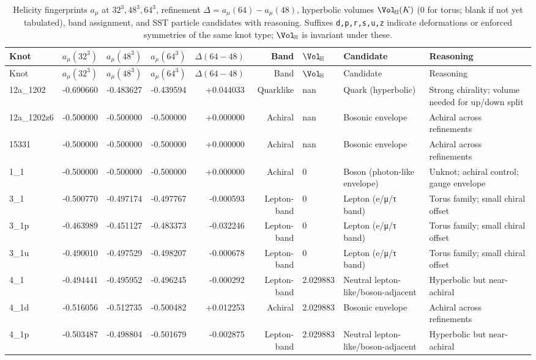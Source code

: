 \begin{longtable}{lrrrrrllp{6.8cm}}
\caption{Helicity fingerprints $a_\mu$ at $32^3,48^3,64^3$, refinement $\Delta=a_\mu(64)-a_\mu(48)$, hyperbolic volumes $\Vol_{\!\mathbb{H}}(K)$ (0 for torus; blank if not yet tabulated), band assignment, and SST particle candidates with reasoning. Suffixes \texttt{d,p,r,s,u,z} indicate deformations or enforced symmetries of the same knot type; $\Vol_{\!\mathbb{H}}$ is invariant under these.}\\
\toprule
Knot & $a_\mu(32^3)$ & $a_\mu(48^3)$ & $a_\mu(64^3)$ & $\Delta(64{-}48)$ & Band & $\Vol_{\!\mathbb{H}}$ & Candidate & Reasoning \\
\midrule
\endfirsthead
\toprule
Knot & $a_\mu(32^3)$ & $a_\mu(48^3)$ & $a_\mu(64^3)$ & $\Delta(64{-}48)$ & Band & $\Vol_{\!\mathbb{H}}$ & Candidate & Reasoning \\
\midrule
\endhead
\bottomrule
\endlastfoot
12a\_1202 & -0.690660 & -0.483627 & -0.439594 & +0.044033 & Quarklike & nan & Quark (hyperbolic) & Strong chirality; volume needed for up/down split \\
12a\_1202z6 & -0.500000 & -0.500000 & -0.500000 & +0.000000 & Achiral & nan & Bosonic envelope & Achiral across refinements \\
15331 & -0.500000 & -0.500000 & -0.500000 & +0.000000 & Achiral & nan & Bosonic envelope & Achiral across refinements \\
1\_1 & -0.500000 & -0.500000 & -0.500000 & +0.000000 & Achiral & 0 & Boson (photon-like envelope) & Unknot; achiral control; gauge envelope \\
3\_1 & -0.500770 & -0.497174 & -0.497767 & -0.000593 & Lepton-band & 0 & Lepton (e/μ/τ band) & Torus family; small chiral offset \\
3\_1p & -0.463989 & -0.451127 & -0.483373 & -0.032246 & Lepton-band & 0 & Lepton (e/μ/τ band) & Torus family; small chiral offset \\
3\_1u & -0.490010 & -0.497529 & -0.498207 & -0.000678 & Lepton-band & 0 & Lepton (e/μ/τ band) & Torus family; small chiral offset \\
4\_1 & -0.494441 & -0.495952 & -0.496245 & -0.000292 & Lepton-band & 2.029883 & Neutral lepton-like/boson-adjacent & Hyperbolic but near-achiral \\
4\_1d & -0.516056 & -0.512735 & -0.500482 & +0.012253 & Achiral & 2.029883 & Bosonic envelope & Achiral across refinements \\
4\_1p & -0.503487 & -0.498804 & -0.501679 & -0.002875 & Lepton-band & 2.029883 & Neutral lepton-like/boson-adjacent & Hyperbolic but near-achiral \\

\end{longtable}
